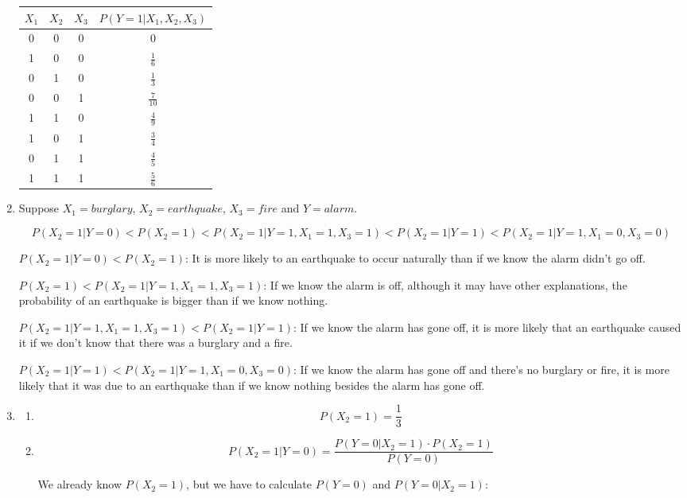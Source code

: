 \documentclass[11]{article}
\begin{document}
\begin{enumerate}[label=(\alph*)]
\begin{table}[htp]
\centering
\begin{tabular}{|c|c|c|c|}
\hline
$X_1$ & $X_2$ & $X_3$ & $P(Y=1|X_1,X_2,X_3)$ \\ \hline
0     & 0     & 0     & 0                    \\ \hline
1     & 0     & 0     & $\frac{1}{6}$        \\ \hline
0     & 1     & 0     & $\frac{1}{3}$        \\ \hline
0     & 0     & 1     & $\frac{7}{10}$       \\ \hline
1     & 1     & 0     & $\frac{4}{9}$        \\ \hline
1     & 0     & 1     & $\frac{3}{4}$        \\ \hline
0     & 1     & 1     & $\frac{4}{5}$        \\ \hline
1     & 1     & 1     & $\frac{5}{6}$        \\ \hline
\end{tabular}
\end{table}

\item
Suppose $X_1=burglary$, $X_2=earthquake$, $X_3=fire$ and $Y=alarm$.

$$P(X_2=1|Y=0)<P(X_2=1)<P(X_2=1|Y=1,X_1=1,X_3=1)<P(X_2=1|Y=1)<P(X_2=1|Y=1,X_1=0,X_3=0)$$

$P(X_2=1|Y=0)<P(X_2=1)$: It is more likely to an earthquake to occur naturally than if we know the alarm didn't go off.

$P(X_2=1)<P(X_2=1|Y=1,X_1=1,X_3=1)$: If we know the alarm is off, although it may have other explanations, the probability of an earthquake is bigger than if we know nothing.

$P(X_2=1|Y=1,X_1=1,X_3=1)<P(X_2=1|Y=1)$: If we know the alarm has gone off, it is more likely that an earthquake caused it if we don't know that there was a burglary and a fire.

$P(X_2=1|Y=1)<P(X_2=1|Y=1,X_1=0,X_3=0)$: If we know the alarm has gone off and there's no burglary or fire, it is more likely that it was due to an earthquake than if we know nothing besides the alarm has gone off.
\item
\begin{enumerate}[label*=.\arabic*]
\item 
$$P(X_2=1)=\frac{1}{3}$$
\item 
$$P(X_2=1|Y=0)=\frac{P(Y=0|X_2=1) \cdot P(X_2=1)}{P(Y=0)}$$

We already know $P(X_2=1)$, but we have to calculate $P(Y=0)$ and $P(Y=0|X_2=1)$:


\end{enumerate}
\end{enumerate}
\end{document}
